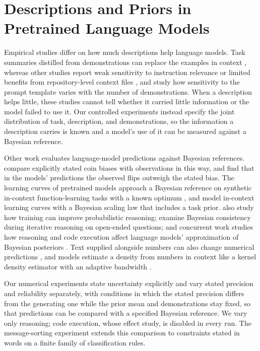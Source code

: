 \section{Descriptions and Priors in Pretrained Language Models}\label{sec:bg-llm}\label{app:related}

Empirical studies differ on how much descriptions help language models. Task summaries distilled from demonstrations can replace the examples in context \citep{honda2025}, whereas other studies report weak sensitivity to instruction relevance \citep{webson2022} or limited benefits from repository-level context files \citep{gloaguen2026}, and \citet{tong2026} study how sensitivity to the prompt template varies with the number of demonstrations. When a description helps little, these studies cannot tell whether it carried little information or the model failed to use it. Our controlled experiments instead specify the joint distribution of task, description, and demonstrations, so the information a description carries is known and a model's use of it can be measured against a Bayesian reference.

Other work evaluates language-model predictions against Bayesian references. \citet{gupta2025} compare explicitly stated coin biases with observations in this way, and find that in the models' predictions the observed flips outweigh the stated bias. The learning curves of pretrained models approach a Bayesian reference on synthetic in-context function-learning tasks with a known optimum \citep{akata2026}, and \citet{arora2025} model in-context learning curves with a Bayesian scaling law that includes a task prior. \citet{qiu2026} also study how training can improve probabilistic reasoning; \citet{he2025} examine Bayesian consistency during iterative reasoning on open-ended questions; and concurrent work studies how reasoning and code execution affect language models' approximation of Bayesian posteriors \citep{filbry2026}. Text supplied alongside numbers can also change numerical predictions \citep{requeima2024}, and models estimate a density from numbers in context like a kernel density estimator with an adaptive bandwidth \citep{liu2025}.

Our numerical experiments state uncertainty explicitly and vary stated precision and reliability separately, with conditions in which the stated precision differs from the generating one while the prior mean and demonstrations stay fixed, so that predictions can be compared with a specified Bayesian reference. We vary only reasoning; code execution, whose effect \citet{filbry2026} study, is disabled in every run. The message-sorting experiment extends this comparison to constraints stated in words on a finite family of classification rules.

